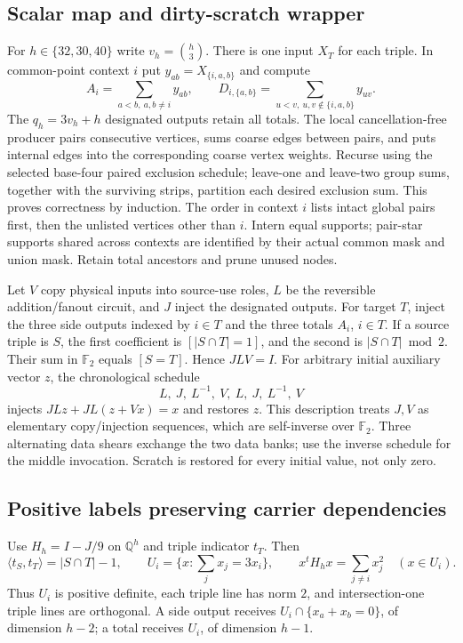 \subsection{Scalar map and dirty-scratch wrapper}
For $h\in\{32,30,40\}$ write $v_h=\binom h3$. There is one input $X_T$
for each triple. In common-point context $i$ put $y_{ab}=X_{\{i,a,b\}}$
and compute
\[
 A_i=\sum_{a<b,\ a,b\ne i}y_{ab},\qquad
 D_{i,\{a,b\}}=\sum_{u<v,\ u,v\notin\{i,a,b\}}y_{uv}.
\]
The $q_h=3v_h+h$ designated outputs retain all totals. The local
cancellation-free producer pairs consecutive vertices, sums coarse edges
between pairs, and puts internal edges into the corresponding coarse
vertex weights. Recurse using the selected base-four paired exclusion schedule; leave-one and leave-two group sums, together with the surviving
strips, partition each desired exclusion sum. This proves correctness by
induction. The order in context $i$ lists intact global pairs first, then
the unlisted vertices other than $i$. Intern equal supports; pair-star
supports shared across contexts are identified by their actual common
mask and union mask. Retain total ancestors and prune unused nodes.

Let $V$ copy physical inputs into source-use roles, $L$ be the reversible
addition/fanout circuit, and $J$ inject the designated outputs. For target
$T$, inject the three side outputs indexed by $i\in T$ and the three
totals $A_i$, $i\in T$. If a source triple is $S$, the first coefficient
is $[|S\cap T|=1]$, and the second is $|S\cap T|\bmod2$.
Their sum in $\mathbb F_2$ equals $[S=T]$. Hence $JLV=I$.
For arbitrary initial auxiliary vector $z$, the chronological schedule
\[
 L,\ J,\ L^{-1},\ V,\ L,\ J,\ L^{-1},\ V
\]
injects $JLz+JL(z+Vx)=x$ and restores $z$. This description treats $J,V$
as elementary copy/injection sequences, which are self-inverse over
$\mathbb F_2$. Three alternating data shears exchange the two data banks;
use the inverse schedule for the middle invocation. Scratch is restored
for every initial value, not only zero.

\subsection{Positive labels preserving carrier dependencies}
Use $H_h=I-J/9$ on $\mathbb Q^h$ and triple indicator $t_T$. Then
\[
 \langle t_S,t_T\rangle=|S\cap T|-1,\qquad
 U_i=\{x:\textstyle\sum_jx_j=3x_i\},\qquad
 x^tH_hx=\sum_{j\ne i}x_j^2\quad(x\in U_i).
\]
Thus $U_i$ is positive definite, each triple line has norm $2$, and
intersection-one triple lines are orthogonal. A side output receives
$U_i\cap\{x_a+x_b=0\}$, of dimension $h-2$; a total receives $U_i$,
of dimension $h-1$.

